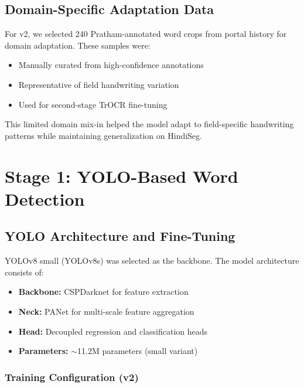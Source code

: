 \documentclass[14pt,a4paper]{article}
\begin{document}
\subsection{Domain-Specific Adaptation Data}

For v2, we selected 240 Pratham-annotated word crops from portal history for domain adaptation. These samples were:
\begin{itemize}
    \item Manually curated from high-confidence annotations
    \item Representative of field handwriting variation
    \item Used for second-stage TrOCR fine-tuning
\end{itemize}

This limited domain mix-in helped the model adapt to field-specific handwriting patterns while maintaining generalization on HindiSeg.
\newpage
\section{Stage 1: YOLO-Based Word Detection}

\subsection{YOLO Architecture and Fine-Tuning}

YOLOv8 small (YOLOv8s) was selected as the backbone. The model architecture consists of:
\begin{itemize}
    \item \textbf{Backbone:} CSPDarknet for feature extraction
    \item \textbf{Neck:} PANet for multi-scale feature aggregation
    \item \textbf{Head:} Decoupled regression and classification heads
    \item \textbf{Parameters:} $\sim$11.2M parameters (small variant)
\end{itemize}

\subsubsection{Training Configuration (v2)}
\end{document}
